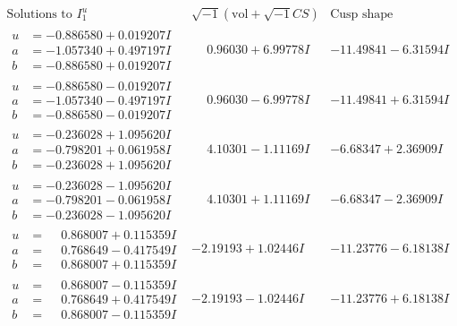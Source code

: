 \documentclass[1p]{elsarticle_modified}
\theoremstyle{definition}
\newcommand{\I}{\sqrt{-1}}
\begin{document}
$$\begin{array}{c|c|c}  
\text{Solutions to }I^u_{1}& \I (\text{vol} + \sqrt{-1}CS) & \text{Cusp shape}\\
 \hline 
\begin{aligned}
u &= -0.886580 + 0.019207 I \\
a &= -1.057340 + 0.497197 I \\
b &= -0.886580 + 0.019207 I\end{aligned}
 & \phantom{-}0.96030 + 6.99778 I & -11.49841 - 6.31594 I \\ \hline\begin{aligned}
u &= -0.886580 - 0.019207 I \\
a &= -1.057340 - 0.497197 I \\
b &= -0.886580 - 0.019207 I\end{aligned}
 & \phantom{-}0.96030 - 6.99778 I & -11.49841 + 6.31594 I \\ \hline\begin{aligned}
u &= -0.236028 + 1.095620 I \\
a &= -0.798201 + 0.061958 I \\
b &= -0.236028 + 1.095620 I\end{aligned}
 & \phantom{-}4.10301 - 1.11169 I & -6.68347 + 2.36909 I \\ \hline\begin{aligned}
u &= -0.236028 - 1.095620 I \\
a &= -0.798201 - 0.061958 I \\
b &= -0.236028 - 1.095620 I\end{aligned}
 & \phantom{-}4.10301 + 1.11169 I & -6.68347 - 2.36909 I \\ \hline\begin{aligned}
u &= \phantom{-}0.868007 + 0.115359 I \\
a &= \phantom{-}0.768649 - 0.417549 I \\
b &= \phantom{-}0.868007 + 0.115359 I\end{aligned}
 & -2.19193 + 1.02446 I & -11.23776 - 6.18138 I \\ \hline\begin{aligned}
u &= \phantom{-}0.868007 - 0.115359 I \\
a &= \phantom{-}0.768649 + 0.417549 I \\
b &= \phantom{-}0.868007 - 0.115359 I\end{aligned}
 & -2.19193 - 1.02446 I & -11.23776 + 6.18138 I \\ \hline\begin{aligned}

\end{aligned}
\end{array}$$
\end{document}
